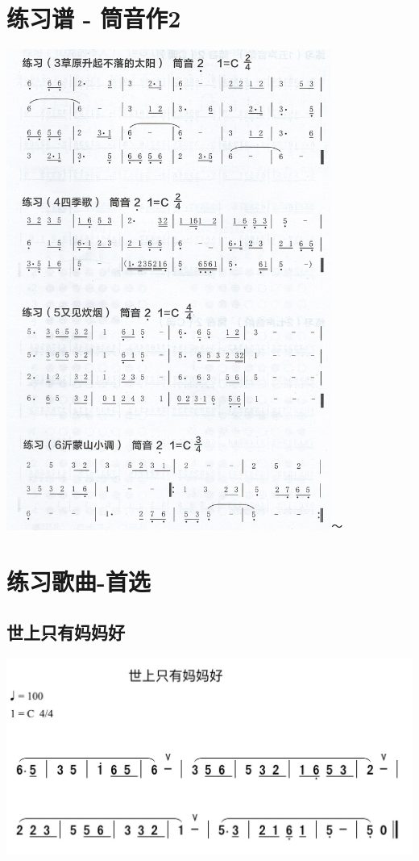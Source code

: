 \documentclass[cn,pad,chinese]{elegantbook}
\begin{document}
\chapter{练习谱 - 筒音作2}
	\includegraphics[width=0.8\textwidth]{dongxiao/Scan 6.jpeg}～

\chapter{练习歌曲-首选}
\section{世上只有妈妈好}
	\includegraphics[width=\textwidth]{dongxiao/IMG_0854-世上只有妈妈好.png}
\end{document}
